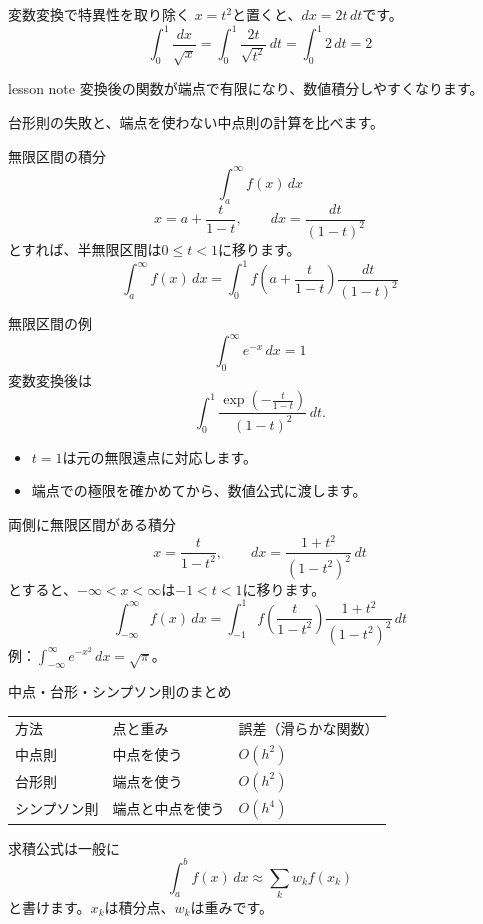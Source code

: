 \documentclass[12pt,aspectratio=43]{beamer}
\newenvironment{lessonbox}
  {\begin{beamercolorbox}[wd=\linewidth,sep=1.5mm]{lesson note}}
  {\end{beamercolorbox}\par}
\begin{document}
\begin{frame}[t]{変数変換で特異性を取り除く}
  $x=t^2$と置くと、$dx=2t\,dt$です。
  \[
    \int_0^1\frac{dx}{\sqrt{x}}=\int_0^1\frac{2t}{\sqrt{t^2}}\,dt=\int_0^1 2\,dt=2
  \]
  \begin{lessonbox}
    変換後の関数が端点で有限になり、数値積分しやすくなります。
  \end{lessonbox}
  \small 台形則の失敗と、端点を使わない中点則の計算を比べます。
\end{frame}

\begin{frame}[t]{無限区間の積分}
  \[
    \int_a^\infty f(x)\,dx
  \]
  \[
    x=a+\frac{t}{1-t},\qquad dx=\frac{dt}{(1-t)^2}
  \]
  とすれば、半無限区間は$0\leq t<1$に移ります。
  \[
    \int_a^\infty f(x)\,dx=\int_0^1 f\!\left(a+\frac{t}{1-t}\right)\frac{dt}{(1-t)^2}
  \]
\end{frame}

\begin{frame}[t]{無限区間の例}
  \[
    \int_0^\infty e^{-x}\,dx=1
  \]
  変数変換後は
  \[
    \int_0^1 \frac{\exp\!\left(-\frac{t}{1-t}\right)}{(1-t)^2}\,dt.
  \]
  \begin{itemize}
    \item $t=1$は元の無限遠点に対応します。
    \item 端点での極限を確かめてから、数値公式に渡します。
  \end{itemize}
\end{frame}

\begin{frame}[t]{両側に無限区間がある積分}
  \[
    x=\frac{t}{1-t^2},\qquad dx=\frac{1+t^2}{(1-t^2)^2}\,dt
  \]
  とすると、$-\infty<x<\infty$は$-1<t<1$に移ります。
  \[
    \int_{-\infty}^{\infty}f(x)\,dx=\int_{-1}^1 f\!\left(\frac{t}{1-t^2}\right)\frac{1+t^2}{(1-t^2)^2}\,dt
  \]
  例：$\int_{-\infty}^{\infty}e^{-x^2}\,dx=\sqrt{\pi}$。
\end{frame}

\begin{frame}[t]{中点・台形・シンプソン則のまとめ}
  \small
  \begingroup\centering
    \renewcommand{\arraystretch}{1.6}
    \begin{tabular}{lll}
      方法 & 点と重み & 誤差（滑らかな関数） \\
      中点則 & 中点を使う & $O(h^2)$ \\
      台形則 & 端点を使う & $O(h^2)$ \\
      シンプソン則 & 端点と中点を使う & $O(h^4)$
    \end{tabular}\par
  \endgroup
  \vspace{3mm}
  求積公式は一般に
  \[
    \int_a^b f(x)\,dx\approx\sum_k w_k f(x_k)
  \]
  と書けます。$x_k$は積分点、$w_k$は重みです。
\end{frame}
\end{document}
